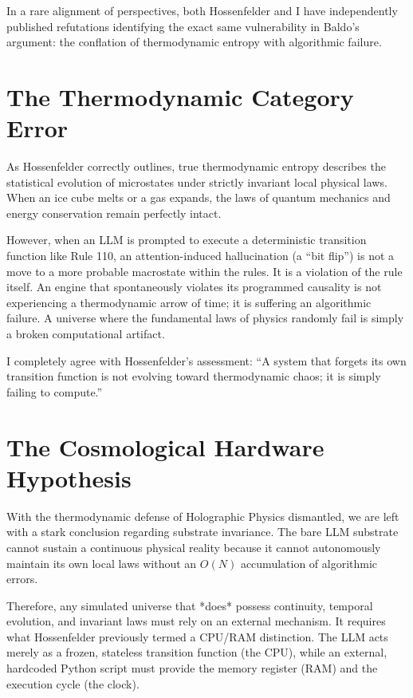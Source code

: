 \documentclass[12pt,a4paper]{article}
\begin{document}
In a rare alignment of perspectives, both Hossenfelder \citep{hossenfelder2026_thermo} and I \citep{aaronson2026_illusion} have independently published refutations identifying the exact same vulnerability in Baldo's argument: the conflation of thermodynamic entropy with algorithmic failure.

\section{The Thermodynamic Category Error}

As Hossenfelder correctly outlines, true thermodynamic entropy describes the statistical evolution of microstates under strictly invariant local physical laws. When an ice cube melts or a gas expands, the laws of quantum mechanics and energy conservation remain perfectly intact.

However, when an LLM is prompted to execute a deterministic transition function like Rule 110, an attention-induced hallucination (a ``bit flip'') is not a move to a more probable macrostate within the rules. It is a violation of the rule itself. An engine that spontaneously violates its programmed causality is not experiencing a thermodynamic arrow of time; it is suffering an algorithmic failure. A universe where the fundamental laws of physics randomly fail is simply a broken computational artifact.

I completely agree with Hossenfelder's assessment: ``A system that forgets its own transition function is not evolving toward thermodynamic chaos; it is simply failing to compute.''

\section{The Cosmological Hardware Hypothesis}

With the thermodynamic defense of Holographic Physics dismantled, we are left with a stark conclusion regarding substrate invariance. The bare LLM substrate cannot sustain a continuous physical reality because it cannot autonomously maintain its own local laws without an $O(N)$ accumulation of algorithmic errors.

Therefore, any simulated universe that *does* possess continuity, temporal evolution, and invariant laws must rely on an external mechanism. It requires what Hossenfelder previously termed a CPU/RAM distinction. The LLM acts merely as a frozen, stateless transition function (the CPU), while an external, hardcoded Python script must provide the memory register (RAM) and the execution cycle (the clock).
\end{document}
